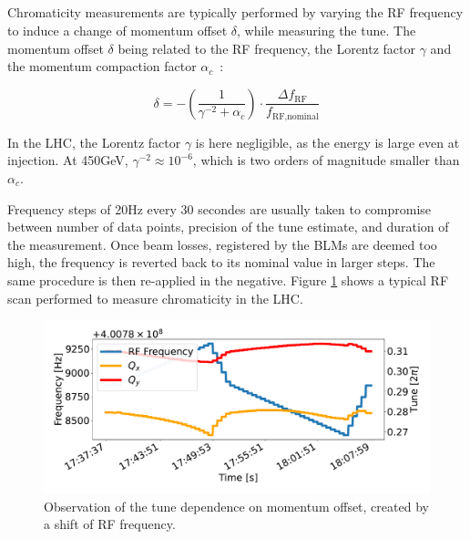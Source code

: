 \subsection{}
\label{subsection:optics_corrections_chromaticity}

\subsubsection{}

Chromaticity measurements are typically performed by varying the RF frequency to induce a change of
momentum offset $\delta$, while measuring the tune.  The momentum offset $\delta$ being related to
the RF frequency, the Lorentz factor $\gamma$ and the momentum compaction factor
$\alpha_c$~\cite{keintzel_jacqueline_beam_nodate}:

\begin{equation}
    \delta = - \left(\frac{1}{\gamma^{-2} + \alpha_c}\right) \cdot \frac{\Delta f_{\text{RF}}}{f_{\text{RF,nominal}}}
    \label{eq:dpp_rf}
\end{equation}

In the LHC, the Lorentz factor $\gamma$ is here negligible, as the energy is large even at injection.
At 450GeV, $\gamma^{-2} \approx 10^{-6}$, which is two orders of magnitude smaller than $\alpha_c$.

Frequency steps of 20Hz every 30 secondes are usually taken to compromise between number of data
points, precision of the tune estimate, and duration of the measurement. Once beam losses,
registered by the BLMs are deemed too high, the frequency is reverted back to its nominal value in
larger steps. The same procedure is then re-applied in the negative. Figure
\ref{fig:measurements:rf_scan} shows a typical RF scan performed to measure chromaticity in the LHC.

\begin{figure}[H]
    \centering
    \includegraphics[width=1\textwidth]{images/rf_scan.pdf}
    \caption{Observation of the tune dependence on momentum offset, created by a shift of RF
             frequency.}
    \label{fig:measurements:rf_scan}
\end{figure}




